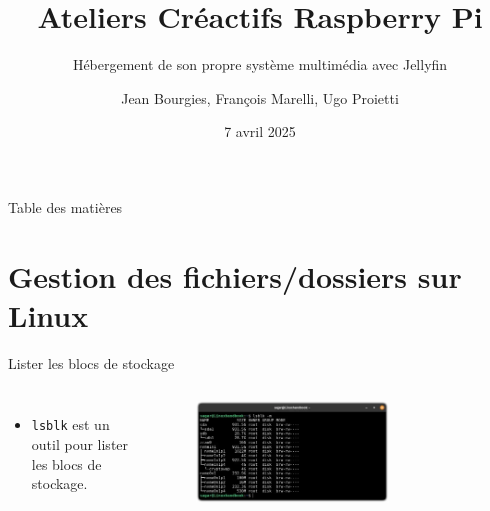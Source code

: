 \documentclass[aspectratio=169,xcolor=dvipsnames]{beamer}
\title{Ateliers Créactifs Raspberry Pi}
\subtitle{Hébergement de son propre système multimédia avec Jellyfin}
\author{Jean Bourgies, François Marelli, Ugo Proietti}
\date{7 avril 2025}
\begin{document}
\begin{frame}
    \titlepage
\end{frame}

\begin{frame}{Table des matières}
    \tableofcontents
\end{frame}


\section{Gestion des fichiers/dossiers sur Linux}

\begin{frame}{Lister les blocs de stockage}
    \begin{columns}[c] %

        \begin{itemize}
            \item \texttt{lsblk} est un outil pour lister les blocs de stockage.
        \end{itemize}
        \begin{figure}
            \includegraphics[width=0.7\textwidth]{images/lsblk.png}
        \end{figure}

    \end{columns}
\end{frame}
\end{document}

